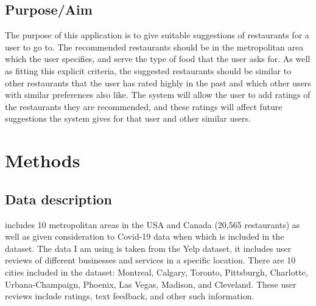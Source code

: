 \documentclass[conference]{IEEEtran}
\begin{document}
\subsection{Purpose/Aim}
The purpose of this application is to give suitable suggestions of restaurants for a user to go to. 
The recommended restaurants should be in the metropolitan area which the user specifies, and serve the 
type of food that the user asks for. 
As well as fitting this explicit criteria, the suggested restaurants should be similar to other restaurants 
that the user has rated highly in the past and which other users with similar preferences also like. 
The system will allow the user to add ratings of the restaurants they are recommended, and these ratings will 
affect future suggestions the system gives for that user and other similar users. 


\section{Methods}

\subsection{Data description}
includes 10 metropolitan areas in the USA and Canada (20,565 restaurants) as well as given consideration 
to Covid-19 data when  which is included in the dataset. 
The data I am using is taken from the Yelp dataset,
it includes user reviews of different businesses and services in a specific location.
There are 10 cities included in the dataset: Montreal, Calgary, Toronto, Pittsburgh, Charlotte, 
Urbana-Champaign, Phoenix, Las Vegas, Madison, and Cleveland. 
These user reviews include ratings, text feedback, and other such information.
\end{document}
